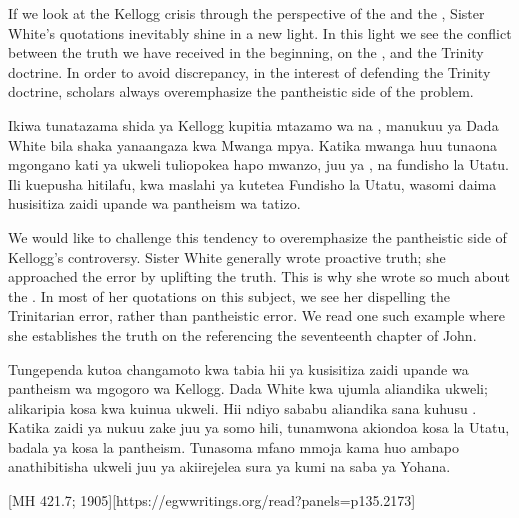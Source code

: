 



If we look at the Kellogg crisis through the perspective of the  and the , Sister White’s quotations inevitably shine in a new light. In this light we see the conflict between the truth we have received in the beginning, on the , and the Trinity doctrine. In order to avoid discrepancy, in the interest of defending the Trinity doctrine, scholars always overemphasize the pantheistic side of the problem.


Ikiwa tunatazama shida ya Kellogg kupitia mtazamo wa  na , manukuu ya Dada White bila shaka yanaangaza kwa Mwanga mpya. Katika mwanga huu tunaona mgongano kati ya ukweli tuliopokea hapo mwanzo, juu ya , na fundisho la Utatu. Ili kuepusha hitilafu, kwa maslahi ya kutetea Fundisho la Utatu, wasomi daima husisitiza zaidi upande wa pantheism wa tatizo.


We would like to challenge this tendency to overemphasize the pantheistic side of Kellogg’s controversy. Sister White generally wrote proactive truth; she approached the error by uplifting the truth. This is why she wrote so much about the . In most of her quotations on this subject, we see her dispelling the Trinitarian error, rather than pantheistic error. We read one such example where she establishes the truth on the  referencing the seventeenth chapter of John.


Tungependa kutoa changamoto kwa tabia hii ya kusisitiza zaidi upande wa pantheism wa mgogoro wa Kellogg. Dada White kwa ujumla aliandika ukweli; alikaripia kosa kwa kuinua ukweli. Hii ndiyo sababu aliandika sana kuhusu . Katika zaidi ya nukuu zake juu ya somo hili, tunamwona akiondoa kosa la Utatu, badala ya kosa la pantheism. Tunasoma mfano mmoja kama huo ambapo anathibitisha ukweli juu ya  akiirejelea sura ya kumi na saba ya Yohana.


[MH 421.7; 1905][https://egwwritings.org/read?panels=p135.2173]


